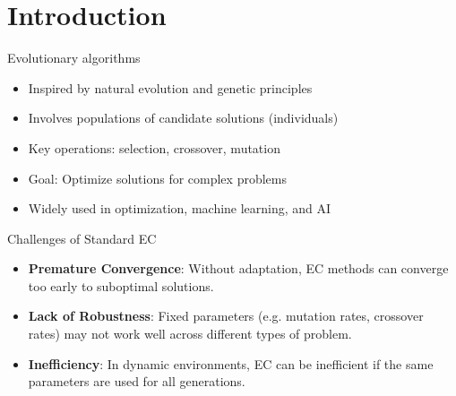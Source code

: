 \section{Introduction}
    
    \frame{\sectionpage}

    
    \begin{frame}{Evolutionary algorithms}

        \begin{itemize}
            \item Inspired by natural evolution and genetic principles
            \item Involves populations of candidate solutions (individuals)
            \item Key operations: selection, crossover, mutation
            \item Goal: Optimize solutions for complex problems
            \item Widely used in optimization, machine learning, and AI
        \end{itemize}
        
    
    \end{frame}
    
    \begin{frame}{Challenges of Standard EC}
        \begin{itemize}
            \setlength{\itemsep}{10pt} 
            \item \textbf{Premature Convergence}: Without adaptation, EC methods can converge too early to suboptimal solutions.
            \item \textbf{Lack of Robustness}: Fixed parameters (e.g. mutation rates, crossover rates) may not work well across different types of problem. 
            \item \textbf{Inefficiency}: In dynamic environments, EC can be inefficient if the same parameters are used for all generations.
        \end{itemize}
    \end{frame}
    

